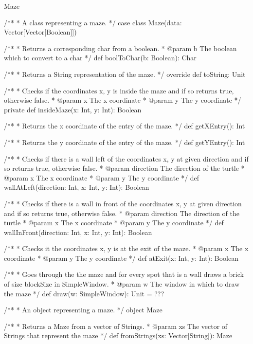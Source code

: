 \begin{ScalaSpec}{Maze}

/**
 *  A class representing a maze.
 */
case class Maze(data: Vector[Vector[Boolean]]) {
  
  /**
   *  Returns a corresponding char from a boolean.
   *  @param b	The boolean which to convert to a char
   */
  def boolToChar(b: Boolean): Char

  /**
   *  Returns a String representation of the maze.
   */
  override def toString: Unit

  /**
   *  Checks if the coordinates x, y is inside the maze and if so returns true, otherwise false.
   *  @param x		The x coordinate
   *  @param y		The y coordinate
   */
  private def insideMaze(x: Int, y: Int): Boolean

  /**
   *  Returns the x coordinate of the entry of the maze.
   */
  def getXEntry(): Int

  /**
   * Returns the y coordinate of the entry of the maze.
   */
  def getYEntry(): Int

  /**
   *  Checks if there is a wall left of the coordinates x, y at given direction and if so returns true, otherwise false.
   *  @param direction	The direction of the turtle
   *  @param x					The x coordinate
   *  @param y					The y coordinate
   */
  def wallAtLeft(direction: Int, x: Int, y: Int): Boolean

  /**
   *  Checks if there is a wall in front of the coordinates x, y at given direction and if so returns true, otherwise false.
   *  @param direction	The direction of the turtle
   *  @param x					The x coordinate
   *  @param y					The y coordinate
   */
  def wallInFront(direction: Int, x: Int, y: Int): Boolean

  /**
   *  Checks it the coordinates x, y is at the exit of the maze.
   *  @param x					The x coordinate
   *  @param y					The y coordinate
   */
  def atExit(x: Int, y: Int): Boolean

  /**
   *  Goes through the the maze and for every spot that is a wall draws a brick of size blockSize in SimpleWindow.
   *  @param w		The window in which to draw the maze
   */
  def draw(w: SimpleWindow): Unit = ???
    
}

/**
 *  An object representing a maze.
 */
object Maze {

  /**
   *  Returns a Maze from a vector of Strings.
   *  @param xs	The vector of Strings that represent the maze
   */
  def fromStrings(xs: Vector[String]): Maze

}
\end{ScalaSpec}
